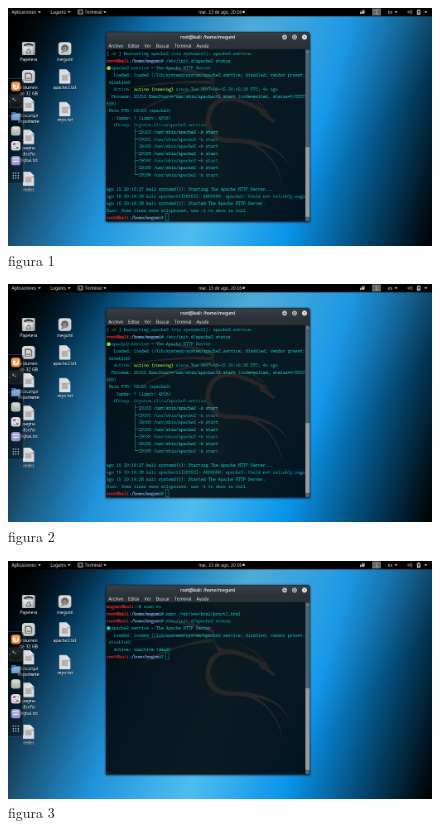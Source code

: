 \documentclass[12pt,letterpaper]{article}
\begin{document}
\begin{center}
\begin{figure}[h]
\includegraphics[width=400pt]{./imgs/2.png}
\caption{figura 1}\label{figure 1}
\end{figure}

\begin{figure}[h]
\includegraphics[width=400pt]{./imgs/2.png}
\caption{figura 2}\label{figure 2}
\end{figure}

\begin{figure}[!ht]
\includegraphics[width=400pt]{./imgs/1.png}
\caption{figura 3}\label{figure 3}
\end{figure}


\end{center}
\end{document}
